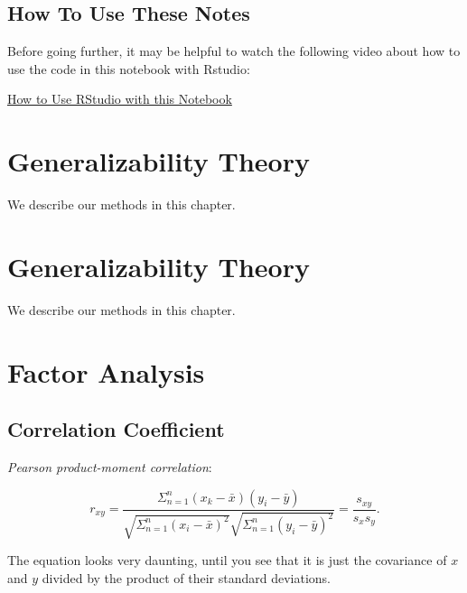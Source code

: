\documentclass[
]{book}
\begin{document}
\hypertarget{how-to-use-these-notes}{%
\section*{How To Use These Notes}\label{how-to-use-these-notes}}

Before going further, it may be helpful to watch the following video about how to use the code in this notebook with Rstudio:

\href{https://auburn.hosted.panopto.com/Panopto/Pages/Viewer.aspx?id=13acb849-902a-45c7-bc4e-ad870153fcae}{How to Use RStudio with this Notebook}

\hypertarget{generalizability-theory}{%
\chapter{Generalizability Theory}\label{generalizability-theory}}

We describe our methods in this chapter.

\hypertarget{generalizability-theory-1}{%
\chapter{Generalizability Theory}\label{generalizability-theory-1}}

We describe our methods in this chapter.

\hypertarget{factor-analysis}{%
\chapter{Factor Analysis}\label{factor-analysis}}

\hypertarget{correlation-coefficient}{%
\section{Correlation Coefficient}\label{correlation-coefficient}}

\emph{Pearson product-moment correlation}:

\[
r_{xy} = \frac{\Sigma_{n=1}^n (x_k - \bar{x})(y_i - \bar{y})}{\sqrt{\Sigma_{n=1}^n(x_i - \bar{x})^2} \sqrt{\Sigma_{n=1}^n(y_i - \bar{y})^2}} = \frac{s_{xy}}{s_x s_y}.
\]

The equation looks very daunting, until you see that it is just the covariance of \(x\) and \(y\) divided by the product of their standard deviations.
\end{document}

